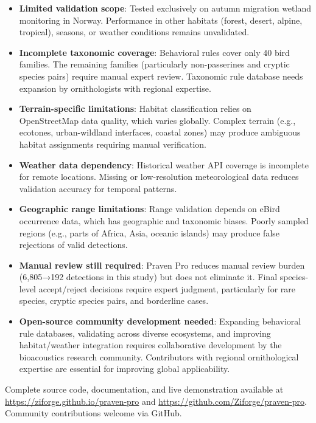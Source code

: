 \documentclass[twocolumn]{article}
\begin{document}
\begin{itemize}
\item \textbf{Limited validation scope}: Tested exclusively on autumn migration wetland monitoring in Norway. Performance in other habitats (forest, desert, alpine, tropical), seasons, or weather conditions remains unvalidated.

\item \textbf{Incomplete taxonomic coverage}: Behavioral rules cover only 40 bird families. The remaining families (particularly non-passerines and cryptic species pairs) require manual expert review. Taxonomic rule database needs expansion by ornithologists with regional expertise.

\item \textbf{Terrain-specific limitations}: Habitat classification relies on OpenStreetMap data quality, which varies globally. Complex terrain (e.g., ecotones, urban-wildland interfaces, coastal zones) may produce ambiguous habitat assignments requiring manual verification.

\item \textbf{Weather data dependency}: Historical weather API coverage is incomplete for remote locations. Missing or low-resolution meteorological data reduces validation accuracy for temporal patterns.

\item \textbf{Geographic range limitations}: Range validation depends on eBird occurrence data, which has geographic and taxonomic biases. Poorly sampled regions (e.g., parts of Africa, Asia, oceanic islands) may produce false rejections of valid detections.

\item \textbf{Manual review still required}: Praven Pro reduces manual review burden (6,805→192 detections in this study) but does not eliminate it. Final species-level accept/reject decisions require expert judgment, particularly for rare species, cryptic species pairs, and borderline cases.

\item \textbf{Open-source community development needed}: Expanding behavioral rule databases, validating across diverse ecosystems, and improving habitat/weather integration requires collaborative development by the bioacoustics research community. Contributors with regional ornithological expertise are essential for improving global applicability.
\end{itemize}

Complete source code, documentation, and live demonstration available at \url{https://ziforge.github.io/praven-pro} and \url{https://github.com/Ziforge/praven-pro}. Community contributions welcome via GitHub.
\end{document}
